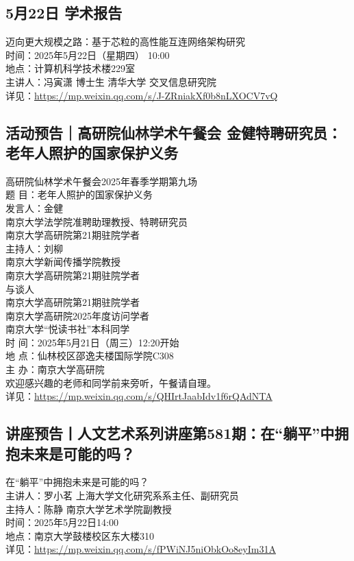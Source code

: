 \documentclass[letterpaper, 12pt]{article}
\begin{document}
\begin{multicols}{2}
\subsection{5月22日 学术报告} %
迈向更大规模之路：基于芯粒的高性能互连网络架构研究
\\时间：2025年5月22日（星期四） 10:00
\\地点：计算机科学技术楼229室
\\主讲人：冯寅潇 博士生 清华大学 交叉信息研究院
\\详见：\url{https://mp.weixin.qq.com/s/J-ZRniakXf0b8nLXOCV7vQ}

\subsection{活动预告｜高研院仙林学术午餐会 金健特聘研究员：老年人照护的国家保护义务} %
高研院仙林学术午餐会2025年春季学期第九场
\\题  目：老年人照护的国家保护义务
\\发言人：金健
\\南京大学法学院准聘助理教授、特聘研究员
\\南京大学高研院第21期驻院学者
\\主持人：刘柳
\\南京大学新闻传播学院教授
\\南京大学高研院第21期驻院学者
\\与谈人
\\南京大学高研院第21期驻院学者
\\南京大学高研院2025年度访问学者
\\南京大学“悦读书社”本科同学
\\时  间：2025年5月21日（周三）12:20开始
\\地  点：仙林校区邵逸夫楼国际学院C308
\\主  办：南京大学高研院
\\欢迎感兴趣的老师和同学前来旁听，午餐请自理。
\\详见：\url{https://mp.weixin.qq.com/s/QHIrtJaabIdv1f6rQAdNTA}

\subsection{讲座预告丨人文艺术系列讲座第581期：在“躺平”中拥抱未来是可能的吗？} %
在“躺平”中拥抱未来是可能的吗？
\\主讲人：罗小茗 上海大学文化研究系系主任、副研究员
\\主持人：陈静 南京大学艺术学院副教授
\\时间：2025年5月22日14:00
\\地点：南京大学鼓楼校区东大楼310
\\详见：\url{https://mp.weixin.qq.com/s/fPWiNJ5niObkOo8eyIm31A}


\end{multicols}
\end{document}
